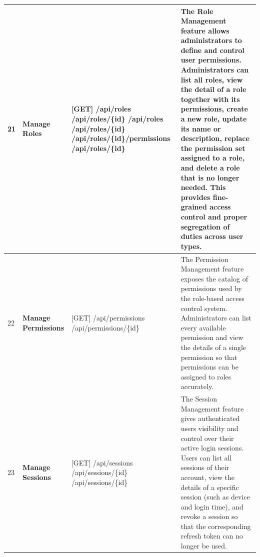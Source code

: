 \begin{longtable}{|C{0.7cm}|L{2.6cm}|S{6.6cm}|L{5.2cm}|}
21
&
\textbf{Manage Roles}
&
[GET] /\allowbreak{}api/\allowbreak{}roles \newline
[GET] /\allowbreak{}api/\allowbreak{}roles/\allowbreak{}\{id\} \newline
[POST] /\allowbreak{}api/\allowbreak{}roles \newline
[PATCH] /\allowbreak{}api/\allowbreak{}roles/\allowbreak{}\{id\} \newline
[PUT] /\allowbreak{}api/\allowbreak{}roles/\allowbreak{}\{id\}/\allowbreak{}permissions \newline
[DELETE] /\allowbreak{}api/\allowbreak{}roles/\allowbreak{}\{id\}
&
The Role Management feature allows administrators to define and control user permissions. Administrators can list all roles, view the detail of a role together with its permissions, create a new role, update its name or description, replace the permission set assigned to a role, and delete a role that is no longer needed. This provides fine-grained access control and proper segregation of duties across user types.
\\ \hline

22
&
\textbf{Manage Permissions}
&
[GET] /\allowbreak{}api/\allowbreak{}permissions \newline
[GET] /\allowbreak{}api/\allowbreak{}permissions/\allowbreak{}\{id\}
&
The Permission Management feature exposes the catalog of permissions used by the role-based access control system. Administrators can list every available permission and view the details of a single permission so that permissions can be assigned to roles accurately.
\\ \hline

23
&
\textbf{Manage Sessions}
&
[GET] /\allowbreak{}api/\allowbreak{}sessions \newline
[GET] /\allowbreak{}api/\allowbreak{}sessions/\allowbreak{}\{id\} \newline
[DELETE] /\allowbreak{}api/\allowbreak{}sessions/\allowbreak{}\{id\}
&
The Session Management feature gives authenticated users visibility and control over their active login sessions. Users can list all sessions of their account, view the details of a specific session (such as device and login time), and revoke a session so that the corresponding refresh token can no longer be used.
\\ \hline


\end{longtable}
